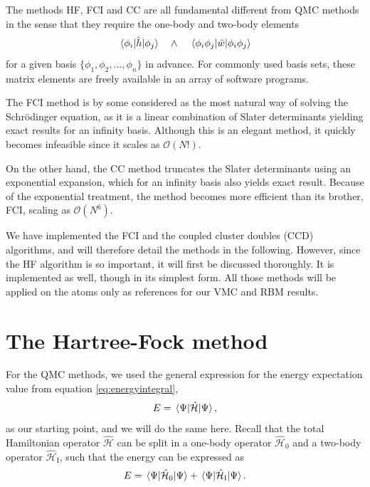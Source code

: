 The methods HF, FCI and CC are all fundamental different from QMC methods in the sense that they require the one-body and two-body elements
\begin{equation}
\mel{\phi_i}{\hat{h}}{\phi_j}\quad\wedge\quad\mel{\phi_i\phi_j}{\hat{w}}{\phi_i\phi_j}
\end{equation}
for a given basis $\{\phi_1,\phi_2,\hdots,\phi_n\}$ in advance. For commonly used basis sets, these matrix elements are freely available in an array of software programs. 

The FCI method is by some considered as the most natural way of solving the Schrödinger equation, as it is a linear combination of Slater determinants yielding exact results for an infinity basis. Although this is an elegant method, it quickly becomes infeasible since it scales as $\mathcal{O}(N!)$. 

On the other hand, the CC method truncates the Slater determinants using an exponential expansion, which for an infinity basis also yields exact result. Because of the exponential treatment, the method becomes more efficient than its brother, FCI, scaling as $\mathcal{O}(N^6)$.

We have implemented the FCI and the coupled cluster doubles (CCD) algorithms, and will therefore detail the methods in the following. However, since the HF algorithm is so important, it will first be discussed thoroughly. It is implemented as well, though in its simplest form. All those methods will be applied on the atoms only as references for our VMC and RBM results.

\section{The Hartree-Fock method}
For the QMC methods, we used the general expression for the energy expectation value from equation \eqref{eq:energyintegral},
\begin{equation}
E=\mel{\Psi}{\hat{\mathcal{H}}}{\Psi},
\end{equation}
as our starting point, and we will do the same here. Recall that the total Hamiltonian operator $\hat{\mathcal{H}}$ can be split in a one-body operator $\hat{\mathcal{H}}_0$ and a two-body operator $\hat{\mathcal{H}}_{\text{I}}$, such that the energy can be expressed as
\begin{equation}
E=\mel{\Psi}{\hat{\mathcal{H}}_0}{\Psi}+\mel{\Psi}{\hat{\mathcal{H}}_{\text{I}}}{\Psi}.
\end{equation}


